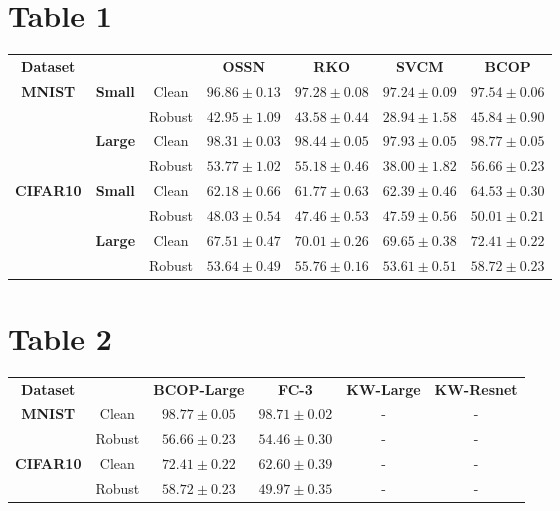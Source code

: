\documentclass{article}%
\begin{document}
%
\normalsize%
\section*{Table 1}%
\label{sec:Table1}%
\begin{tabularx}{\textwidth}{c|cc|cccc}%
\textbf{Dataset}&\textbf{}&\textbf{}&\textbf{OSSN}&\textbf{RKO}&\textbf{SVCM}&\textbf{BCOP}\\%
\cmidrule{1-7}%
\multirow{4}{*}{\textbf{{MNIST}}}&\multirow{2}{*}{\textbf{Small}}&Clean&$96.86\pm0.13$&$97.28\pm0.08$&$97.24\pm0.09$&$\mathbf{97.54}\pm0.06$\\%
&&Robust&$42.95\pm1.09$&$43.58\pm0.44$&$28.94\pm1.58$&$\mathbf{45.84}\pm0.90$\\%
\cmidrule{2-7}%
&\multirow{2}{*}{\textbf{Large}}&Clean&$98.31\pm0.03$&$98.44\pm0.05$&$97.93\pm0.05$&$\mathbf{98.77}\pm0.05$\\%
&&Robust&$53.77\pm1.02$&$55.18\pm0.46$&$38.00\pm1.82$&$\mathbf{56.66}\pm0.23$\\%
\cmidrule{1-7}%
\multirow{4}{*}{\textbf{{CIFAR10}}}&\multirow{2}{*}{\textbf{Small}}&Clean&$62.18\pm0.66$&$61.77\pm0.63$&$62.39\pm0.46$&$\mathbf{64.53}\pm0.30$\\%
&&Robust&$48.03\pm0.54$&$47.46\pm0.53$&$47.59\pm0.56$&$\mathbf{50.01}\pm0.21$\\%
\cmidrule{2-7}%
&\multirow{2}{*}{\textbf{Large}}&Clean&$67.51\pm0.47$&$70.01\pm0.26$&$69.65\pm0.38$&$\mathbf{72.41}\pm0.22$\\%
&&Robust&$53.64\pm0.49$&$55.76\pm0.16$&$53.61\pm0.51$&$\mathbf{58.72}\pm0.23$\\%
\cmidrule{1-7}%
\end{tabularx}

%
\section*{Table 2}%
\label{sec:Table2}%
\begin{tabularx}{\textwidth}{c|c|cccc}%
\textbf{Dataset}&&\textbf{BCOP-Large}&\textbf{FC-3}&\textbf{KW-Large }&\textbf{KW-Resnet}\\%
\cmidrule{1-6}%
\multirow{2}{*}{\textbf{{MNIST}}}&Clean&$\mathbf{98.77}\pm0.05$&$98.71\pm0.02$&{-}&{-}\\%
&Robust&$\mathbf{56.66}\pm0.23$&$54.46\pm0.30$&{-}&{-}\\%
\cmidrule{1-6}%
\multirow{2}{*}{\textbf{{CIFAR10}}}&Clean&$\mathbf{72.41}\pm0.22$&$62.60\pm0.39$&{-}&{-}\\%
&Robust&$\mathbf{58.72}\pm0.23$&$49.97\pm0.35$&{-}&{-}\\%
\cmidrule{1-6}%
\end{tabularx}
\end{document}
